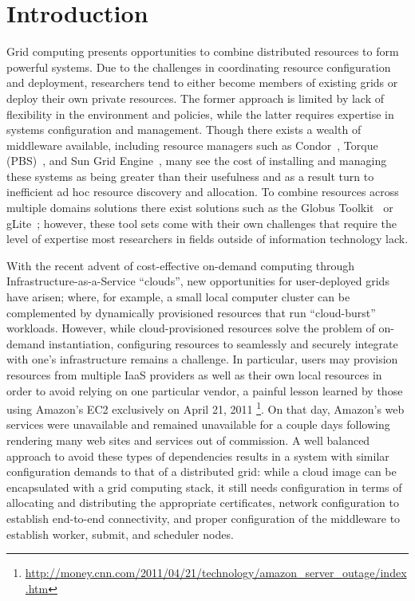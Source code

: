\documentclass[twocolumn]{svjour3}
\begin{document}
\section{Introduction}

Grid computing presents opportunities to combine distributed resources to form
powerful systems.  Due to the challenges in coordinating resource configuration
and deployment, researchers tend to either become members of existing grids or
deploy their own private resources.  The former approach is limited by lack of
flexibility in the environment and policies, while the latter requires
expertise in systems configuration and management.  Though there exists a
wealth of middleware available, including resource managers such as
Condor~\cite{condor0}, Torque (PBS)~\cite{torque}, and Sun Grid
Engine~\cite{grid_engine}, many see the cost of installing and managing these
systems as being greater than their usefulness and as a result turn to
inefficient ad hoc resource discovery and allocation.  To combine resources
across multiple domains solutions there exist solutions such as the Globus
Toolkit~\cite{globus} or gLite~\cite{glite}; however, these tool sets come with
their own challenges that require the level of expertise most researchers in
fields outside of information technology lack.

With the recent advent of cost-effective on-demand computing through
Infrastructure-as-a-Service ``clouds'', new opportunities for user-deployed
grids have arisen; where, for example, a small local computer cluster can be
complemented by dynamically provisioned resources that run ``cloud-burst''
workloads.  However, while cloud-provisioned resources solve the problem of
on-demand instantiation, configuring resources to seamlessly and securely
integrate with one's infrastructure remains a challenge.  In particular, users
may provision resources from multiple IaaS providers as well as their own local
resources in order to avoid relying on one particular vendor, a painful lesson
learned by those using Amazon's EC2 exclusively on April 21, 2011
\footnote{\url{http://money.cnn.com/2011/04/21/technology/amazon_server_outage/index.htm}}.
On that day, Amazon's web services were unavailable and remained unavailable
for a couple days following rendering many web sites and services out of
commission.  A well balanced approach to avoid these types of dependencies
results in a system with similar configuration demands to that of a distributed
grid: while a cloud image can be encapsulated with a grid computing stack, it
still needs configuration in terms of allocating and distributing the
appropriate certificates, network configuration to establish end-to-end
connectivity, and proper configuration of the middleware to establish worker,
submit, and scheduler nodes.  
\end{document}
